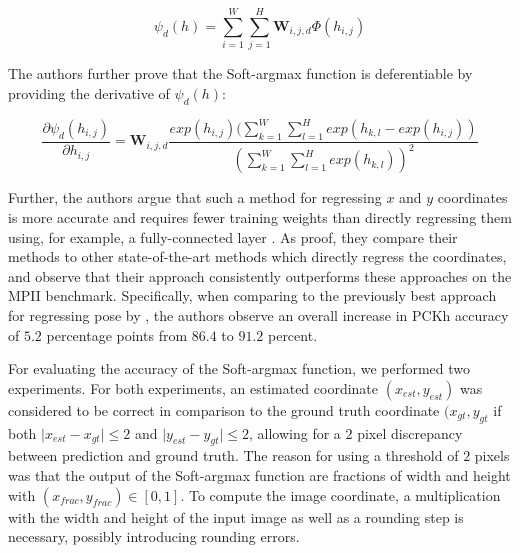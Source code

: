 
\begin{equation}
    \label{eq:softargmax_conv}
    \psi_d(h) = \sum_{i=1}^W \sum_{j=1}^H \bm{W}_{i,j,d} \Phi(h_{i,j})
\end{equation}

The authors further prove that the Soft-argmax function is deferentiable by providing the derivative of $\psi_d(h)$:

\begin{equation}
    \frac{\partial \psi_d(h_{i,j})}{\partial h_{i,j}} = \bm{W}_{i,j,d} \frac{ exp(h_{i,j}) (\sum_{k=1}^W \sum_{l=1}^H exp(h_{k,l} - exp(h_{i,j}) ) } { ( \sum_{k=1}^W \sum_{l=1}^H exp(h_{k,l}) )^2 }
\end{equation}

Further, the authors argue that such a method for regressing $x$ and $y$ coordinates is more accurate and requires fewer training weights than directly regressing them using, for example, a fully-connected layer \cite{luvizon_human_2017}.
As proof, they compare their methods to other state-of-the-art methods which directly regress the coordinates, and observe that their approach consistently outperforms these approaches on the MPII benchmark.
Specifically, when comparing to the previously best approach for regressing pose by \cite{sun_compositional_2017}, the authors observe an overall increase in PCKh accuracy of $5.2$ percentage points from $86.4$ to $91.2$ percent.

For evaluating the accuracy of the Soft-argmax function, we performed two experiments.
For both experiments, an estimated coordinate $(x_{est},y_{est})$ was considered to be correct in comparison to the ground truth coordinate $(x_{gt}, y_{gt}$ if both $\lvert x_{est} - x_{gt} \rvert \leq 2$ and $\lvert y_{est} - y_{gt} \rvert \leq 2$, allowing for a $2$ pixel discrepancy between prediction and ground truth.
The reason for using a threshold of $2$ pixels was that the output of the Soft-argmax function are fractions of width and height with $(x_{frac}, y_{frac}) \in [0,1]$.
To compute the image coordinate, a multiplication with the width and height of the input image as well as a rounding step is necessary, possibly introducing rounding errors.

